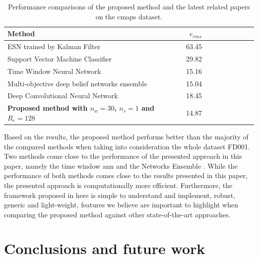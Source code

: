 \documentclass{article}
\begin{document}
\begin{table}[!htb]
\centering
\begin{tabular}{l | r r r r | r r r r}
	\hline	
	Method & $e_{rms}$ \\
  	\hline
  	ESN trained by Kalman Filter \cite{Peng2012} & 63.45\\
  	Support Vector Machine Classifier \cite{Louen2013} & 29.82\\
  	Time Window Neural Network \cite{Lim2016} & 15.16\\
  	Multi-objective deep belief networks ensemble \cite{Zhang2016} & 15.04\\
  	Deep Convolutional Neural Network \cite{Babu2016} & 18.45\\
  	\textbf{Proposed method with $n_w = 30$, $n_s=1$ and $R_e = 128$} & 14.87\\
  	\hline
\end{tabular}
\caption{Performance comparisons of the proposed method and the latest related papers on the \gls{cmaps} dataset.}
\label{table:results_comparison}
\end{table}

Based on the results, the proposed method performs better than the majority of the compared methods when taking into consideration the whole dataset FD001. Two methods come close to the performance of the presented approach in this paper, namely the time window \gls{ann} \cite{Lim2016} and the Networks Ensemble \cite{Zhang2016}. While the performance of both methods comes close to the results presented in this paper, the presented approach is computationally more efficient. Furthermore, the framework proposed in here is simple to understand and implement, robust, generic and light-weight, features we believe are important to highlight when comparing the proposed method against other state-of-the-art approaches.


\section{Conclusions and future work}
\label{sec:conclusions}
\end{document}
